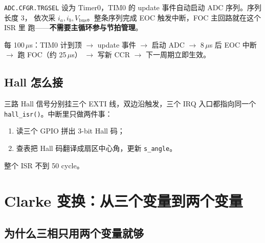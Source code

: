 \documentclass[UTF8,a4paper,11pt]{ctexart}
\newcommand{\reg}[1]{\texttt{#1}}
\newcommand{\code}[1]{\texttt{#1}}
\begin{document}
\reg{ADC.CFGR.TRGSEL} 设为 Timer0，TIM0 的 update 事件自动启动 ADC 序列。序列长度 3，
依次采 $i_a, i_b, V_\text{bus}$。整条序列完成 EOC 触发中断，FOC 主回路就在这个 ISR 里
跑——\textbf{不需要主循环参与节拍管理}。

\begin{center}
\end{center}

每 100\,$\mu$s：TIM0 计到顶 $\to$ update 事件 $\to$ 启动 ADC $\to$ 8\,$\mu$s 后 EOC
中断 $\to$ 跑 FOC（约 25\,$\mu$s） $\to$ 写新 CCR $\to$ 下一周期立即生效。

\subsection{Hall 怎么接}

三路 Hall 信号分别挂三个 EXTI 线，双边沿触发，三个 IRQ 入口都指向同一个
\code{hall\_isr()}。中断里只做两件事：

\begin{enumerate}
  \item 读三个 GPIO 拼出 3-bit Hall 码；
  \item 查表把 Hall 码翻译成扇区中心角，更新 \code{s\_angle}。
\end{enumerate}

整个 ISR 不到 50 cycle。

\section{Clarke 变换：从三个变量到两个变量}

\subsection{为什么三相只用两个变量就够}
\end{document}
